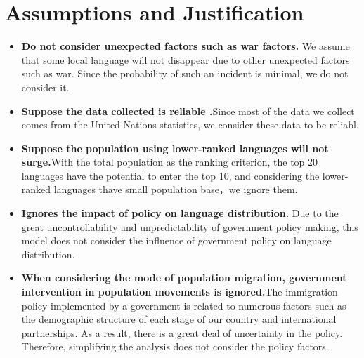 \section{Assumptions and Justification}

\begin{itemize} 
	
    \item \textbf{Do not consider unexpected factors such as war factors. }We assume that some local language will not disappear due to other unexpected factors such as war. Since the probability of such an incident is minimal, we do not consider it.
    
    \item \textbf{Suppose the data collected is reliable .}Since most of the data we collect comes from the United Nations statistics, we consider these data to be reliabl.
    
    \item \textbf{Suppose the population using lower-ranked languages will not surge.}With the total population as the ranking criterion, the top 20 languages have the potential to enter the top 10, and considering the lower-ranked languages thave small population base，we ignore them.
    
    \item \textbf{Ignores the impact of policy on language distribution.} Due to the great uncontrollability and unpredictability of government policy making, this model does not consider the influence of government policy on language distribution.
    
    \item \textbf{When considering the mode of population migration, government intervention in population movements is ignored.}The immigration policy implemented by a government is related to numerous factors such as the demographic structure of each stage of our country and international partnerships. As a result, there is a great deal of uncertainty in the policy. Therefore, simplifying the analysis does not consider the policy factors.
    
	
\end{itemize}